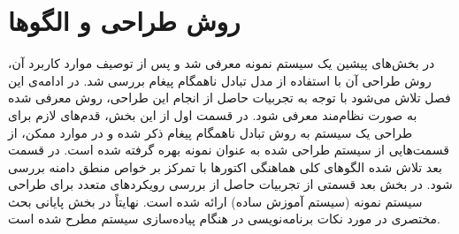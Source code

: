 %
%
%


\chapter{روش طراحی و الگوها}
\label{chapter:RelatedWork}
در بخش‌های پیشین  یک سیستم نمونه معرفی شد و پس از توصیف موارد کاربرد آن، روش طراحی آن با استفاده از مدل تبادل ناهمگام پیغام بررسی شد. در ادامه‌ی این فصل تلاش می‌شود با توجه به تجربیات حاصل از انجام این طراحی، روش معرفی شده به صورت نظام‌مند معرفی شود. در قسمت اول از این بخش، قدم‌های لازم برای طراحی یک سیستم به روش تبادل ناهمگام پیغام ذکر شده و در موارد ممکن، از قسمت‌هایی از سیستم طراحی شده به عنوان نمونه بهره گرفته شده است. در قسمت بعد تلاش شده الگوهای کلی هماهنگی اکتورها با تمرکز بر خواص منطق دامنه بررسی شود. در بخش بعد قسمتی از تجربیات حاصل از بررسی رویکردهای متعدد برای طراحی سیستم نمونه (سیستم آموزش ساده) ارائه شده است. نهایتاً در بخش پایانی بحث مختصری در مورد نکات برنامه‌نویسی در هنگام پیاده‌سازی سیستم مطرح شده است.


